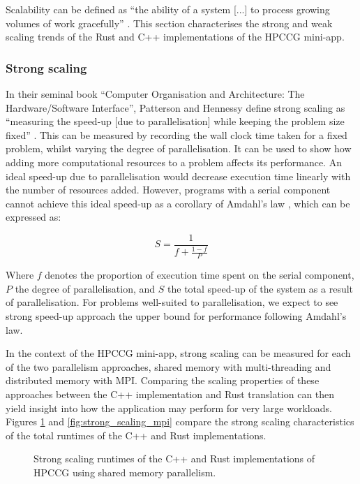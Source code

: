 Scalability can be defined as ``the ability of a system [...] to process growing volumes of work gracefully'' \cite{bondi_characteristics_2000}. This section characterises the strong and weak scaling trends of the Rust and C++ implementations of the HPCCG \acrshort{mini-app}.

\subsubsection{Strong scaling}
\label{sssec:strong-scaling}

In their seminal book ``Computer Organisation and Architecture: The Hardware/Software Interface'', Patterson and Hennessy define strong scaling as ``measuring the speed-up [due to parallelisation] while keeping the problem size fixed'' \cite{pattersonHennessyComputerOrganisationArchitecture}. This can be measured by recording the wall clock time taken for a fixed problem, whilst varying the degree of parallelisation. It can be used to show how adding more computational resources to a problem affects its performance. An ideal speed-up due to parallelisation would decrease execution time linearly with the number of resources added. However, programs with a serial component cannot achieve this ideal speed-up as a corollary of Amdahl's law \cite{amdahlsLaw}, which can be expressed as:

\begin{equation}
    S = \frac{1}{f + \frac{1-f}{P}}
\end{equation}

Where $f$ denotes the proportion of execution time spent on the serial component, $P$ the degree of parallelisation, and $S$ the total speed-up of the system as a result of parallelisation. For problems well-suited to parallelisation, we expect to see strong speed-up approach the upper bound for performance following Amdahl's law.

In the context of the HPCCG \acrshort{mini-app}, strong scaling can be measured for each of the two parallelism approaches, shared memory with multi-threading and distributed memory with MPI. Comparing the scaling properties of these approaches between the C++ implementation and Rust translation can then yield insight into how the application may perform for very large workloads. Figures \ref{fig:strong_scaling_threaded} and \ref{fig:strong_scaling_mpi} compare the strong scaling characteristics of the total runtimes of the C++ and Rust implementations.

\begin{figure}[H]
    \centering
    
    \vspace*{-0.5cm}
    \caption{Strong scaling runtimes of the C++ and Rust implementations of HPCCG using shared memory parallelism.}
    \label{fig:strong_scaling_threaded}
\end{figure}

